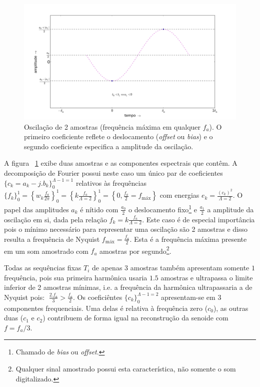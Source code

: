 \begin{figure}[h!]
    \centering
        \includegraphics[width=\textwidth]{figuras/amostras2c__}
    \caption{Oscilação de 2 amostras (frequência máxima em qualquer $f_a$). O primeiro coeficiente reflete o deslocamento (\emph{offset} ou \emph{bias}) e o segundo coeficiente especifica a amplitude da oscilação.}
        \label{fig:amostras2}
\end{figure}

A figura ~\ref{fig:amostras2} exibe duas amostras e as componentes espectrais que contêm. A decomposição de Fourier possui neste caso um único par de coeficientes $\{c_k=a_k-j.b_k\}_0^{\Lambda-1=1}$ relativos às frequências $\{f_k\}_0^1=\left\{w_k\frac{f_a}{2\pi}\right\}_0^1=\left\{k\frac{f_a}{\Lambda=2}\right\}_0^1=\left\{0,\frac{f_a}{2}=f_{\text{máx}}\right\}$
com energias $e_k=\frac{(c_k)^2}{\Lambda=2}$. O papel das amplitudes $a_k$ é nítido com
 $\frac{a_0}{2}$ o deslocamento fixo\footnote{Chamado de \emph{bias} ou \emph{offset}.} e $\frac{a_1}{2}$ a amplitude da oscilação em si, dada pela relação $f_k=k \frac{f_a}{\Lambda=2}$.
Este caso é de especial importância pois o mínimo necessário para representar uma oscilação são 2 amostras e disso resulta a frequência de Nyquist $f_{\text{máx}}=\frac{f_a}{2}$. Esta é a frequência máxima presente em um som amostrado com $f_a$ amostras por segundo\footnote{Qualquer sinal amostrado possui esta característica, não somente o som digitalizado.}.

Todas as sequências fixas $T_i$ de apenas $3$ amostras também apresentam
somente $1$ frequência, pois sua primeira harmônica usaria $1.5$ amostras e ultrapassa o limite inferior de 2 amostras mínimas, i.e. a frequência da harmônica ultrapassaria a de Nyquist pois:  $\; \frac{2. f_a}{3} > \frac{f_a}{2} $. 
Os coeficiêntes $\{c_k\}_0^{\Lambda-1=2}$ apresentam-se em 
3 componentes frequenciais. Uma delas é relativa à frequência zero ($c_0$), as outras duas ($c_1$ e $c_2$) contribuem de forma igual na reconstrução da senoide com $f=f_a/3$.

